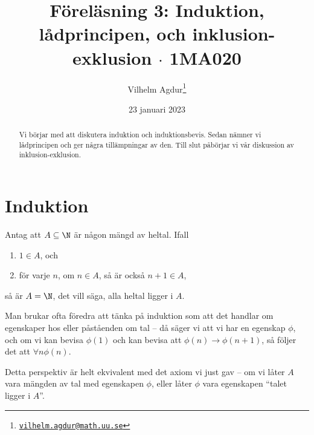 \documentclass[nobib]{tufte-handout}
\title{Föreläsning 3: Induktion, lådprincipen, och inklusion-exklusion $\cdot$ 1MA020}
\author[Vilhelm Agdur]{Vilhelm Agdur\thanks{\href{mailto:vilhelm.agdur@math.uu.se}{\nolinkurl{vilhelm.agdur@math.uu.se}}}}
\date{23 januari 2023}
\begin{document}
\maketitle%

\begin{abstract}
\noindent
Vi börjar med att diskutera induktion och induktionsbevis. Sedan nämner vi lådprincipen och ger några tillämpningar av den. Till slut påbörjar vi vår diskussion av inklusion-exklusion.
\end{abstract}

\section{Induktion}

\begin{axiom}
  Antag att $A \subseteq \N$ är någon mängd av heltal. Ifall
  \begin{enumerate}
    \item $1 \in A$, och
    \item för varje $n$, om $n \in A$, så är också $n + 1 \in A$,
  \end{enumerate}
  så är $A = \N$, det vill säga, alla heltal ligger i $A$.
\end{axiom}

Man brukar ofta föredra att tänka på induktion som att det handlar om egenskaper hos eller påståenden om tal -- då säger vi att vi har en egenskap $\phi$, och om vi kan bevisa $\phi(1)$ och kan bevisa att $\phi(n) \rightarrow \phi(n+1)$, så följer det att $\forall n \phi(n)$.

Detta perspektiv är helt ekvivalent med det axiom vi just gav -- om vi låter $A$ vara mängden av tal med egenskapen $\phi$, eller låter $\phi$ vara egenskapen ``talet ligger i $A$''.
\end{document}
